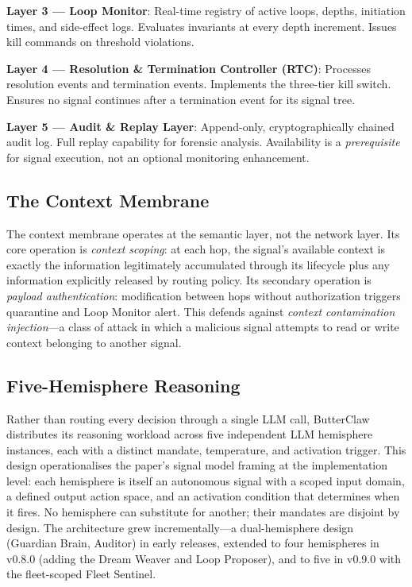 \documentclass[11pt,a4paper]{article}
\begin{document}
\textbf{Layer 3 --- Loop Monitor}: Real-time registry of active loops, depths, initiation times,
and side-effect logs. Evaluates invariants at every depth increment. Issues kill commands on
threshold violations.

\textbf{Layer 4 --- Resolution \& Termination Controller (RTC)}: Processes resolution events and
termination events. Implements the three-tier kill switch. Ensures no signal continues after a
termination event for its signal tree.

\textbf{Layer 5 --- Audit \& Replay Layer}: Append-only, cryptographically chained audit log.
Full replay capability for forensic analysis. Availability is a \emph{prerequisite} for signal
execution, not an optional monitoring enhancement.

\subsection{The Context Membrane}

The context membrane operates at the semantic layer, not the network layer. Its core operation is
\emph{context scoping}: at each hop, the signal's available context is exactly the information
legitimately accumulated through its lifecycle plus any information explicitly released by
routing policy. Its secondary operation is \emph{payload authentication}: modification between
hops without authorization triggers quarantine and Loop Monitor alert. This defends against
\emph{context contamination injection}---a class of attack in which a malicious signal attempts
to read or write context belonging to another signal.

\subsection{Five-Hemisphere Reasoning}
\label{sec:hemispheres}

Rather than routing every decision through a single LLM call, ButterClaw distributes its
reasoning workload across five independent LLM hemisphere instances, each with a distinct
mandate, temperature, and activation trigger. This design operationalises the paper's signal
model framing at the implementation level: each hemisphere is itself an autonomous signal with a
scoped input domain, a defined output action space, and an activation condition that determines
when it fires. No hemisphere can substitute for another; their mandates are disjoint by design.
The architecture grew incrementally---a dual-hemisphere design (Guardian Brain, Auditor) in early
releases, extended to four hemispheres in v0.8.0 (adding the Dream Weaver and Loop Proposer), and
to five in v0.9.0 with the fleet-scoped Fleet Sentinel.
\end{document}
